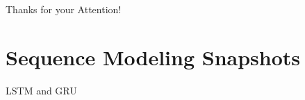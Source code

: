 
\begin{slide}[\slideopts,toc={Hypersphere}]{Thanks for your Attention!}
\vspace{-1em}
\end{slide}

\section[\sectopts,toc={History Samples}]{Sequence Modeling Snapshots}

\begin{slidewhite}[\slideopts, toc={LSTM \& GRU}]{LSTM and GRU}
\vspace{-6em}
\end{slidewhite}

